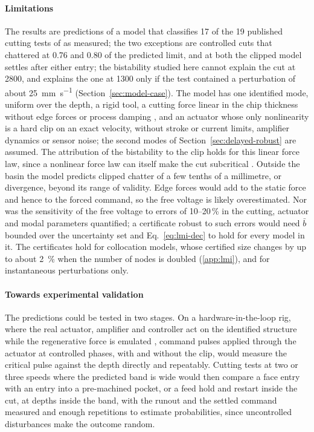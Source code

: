 \paragraph{Limitations}
The results are predictions of a model that classifies 17 of the 19 published cutting tests of \citet{ozsoy2026robust} as measured; the two exceptions are controlled cuts that chattered at 0.76 and 0.80 of the predicted limit, and at both the clipped model settles after either entry; the bistability studied here cannot explain the cut at \SI{2800}{\rpm}, and explains the one at \SI{1300}{\rpm} only if the test contained a perturbation of about \SI{25}{\milli\metre\per\second} (Section~\ref{sec:model-case}). The model has one identified mode, uniform over the depth, a rigid tool, a cutting force linear in the chip thickness without edge forces or process damping \citep{altintas2012book,budak2010process}, and an actuator whose only nonlinearity is a hard clip on an exact velocity, without stroke or current limits, amplifier dynamics or sensor noise; the second modes of Section~\ref{sec:delayed-robust} are assumed. The attribution of the bistability to the clip holds for this linear force law, since a nonlinear force law can itself make the cut subcritical \citep{kalmarnagy2001subcritical,dombovari2008estimates}. Outside the basin the model predicts clipped chatter of a few tenths of a millimetre, or divergence, beyond its range of validity. Edge forces would add to the static force and hence to the forced command, so the free voltage is likely overestimated. Nor was the sensitivity of the free voltage to errors of 10--20\,\% in the cutting, actuator and modal parameters quantified; a certificate robust to such errors would need $\bar b$ bounded over the uncertainty set and Eq.~\eqref{eq:lmi-dec} to hold for every model in it. The certificates hold for collocation models, whose certified size changes by up to about \SI{2}{\percent} when the number of nodes is doubled (\ref{app:lmi}), and for instantaneous perturbations only.

\paragraph{Towards experimental validation}
The predictions could be tested in two stages. On a hardware-in-the-loop rig, where the real actuator, amplifier and controller act on the identified structure while the regenerative force is emulated \citep{sahu2021bistability,sahu2023adaptive,mancisidor2019mechatronics}, command pulses applied through the actuator at controlled phases, with and without the clip, would measure the critical pulse against the depth directly and repeatably. Cutting tests at two or three speeds where the predicted band is wide would then compare a face entry with an entry into a pre-machined pocket, or a feed hold and restart inside the cut, at depths inside the band, with the runout and the settled command measured and enough repetitions to estimate probabilities, since uncontrolled disturbances make the outcome random.

